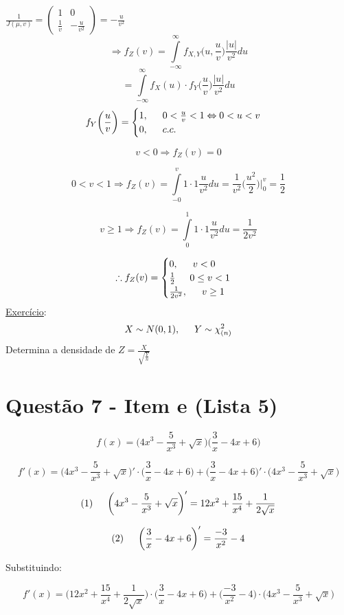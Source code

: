 \documentclass[a4paper,12pt]{article}
\begin{document}
	$
	\frac{1}{J(\mu,v)}=\begin{pmatrix}
	1 & 0\\
	\frac{1}{v} & -\frac{u}{v^2}
	\end{pmatrix} = -\frac{u}{v^2}
	$
	\\
	$$\Rightarrow f_Z(v)= \int\limits_{-\infty}^{\infty}f_{X,Y}\bigg(u,\frac{u}{v}\bigg)  \frac{|u|}{v^2}du$$
	$$=\int\limits_{-\infty}^{\infty}f_X(u)\cdot f_Y\bigg(\frac{u}{v}\bigg)   \frac{|u|}{v^2}du$$
	$$f_Y\bigg(\frac{u}{v}\bigg) = \begin{cases}
	1, \indent 0<\frac{u}{v}<1 \Leftrightarrow 0<u<v\\
	0, \indent c.c.
	\end{cases} $$
	
	$$v<0 \Rightarrow f_Z(v)=0 $$
	
	$$0<v<1\Rightarrow f_Z(v) = \int\limits_{-0}^{v} 1\cdot 1 \frac{u}{v^2} du = \frac{1}{v^2}\bigg(\frac{u^2}{2}\bigg)\bigg|_0^v=\frac{1}{2}$$
	
	$$v\ge 1 \Rightarrow f_Z(v) = \int\limits_{0}^{1} 1\cdot 1 \frac{u}{v^2}du = \frac{1}{2v^2}$$
	
	$$\therefore f_Z(v)=\begin{cases}
	0,\indent v<0\\
	\frac{1}{2 } \indent 0\le v<1\\
	\frac{1}{2v^2},\indent v\ge 1
	\end{cases} $$
	\newpage
	\underline{Exercício}:
	$$X\sim N(0,1),\indent Y\sim \chi^2_{(n)} $$
	Determina a densidade de $Z=\frac{X}{\sqrt{\frac{Y}{n}}}$ 
	
	\newpage 
	\section*{Questão 7 - Item e (Lista 5) }
	$$f(x)=\bigg(4x^3 -\frac{5}{x^3}+\sqrt x \bigg)
	\bigg(
	\frac{3}{x} - 4x+6
	\bigg)
	$$
	
	$$f'(x) = \bigg(4x^3 -\frac{5}{x^3}+\sqrt x\bigg)'\cdot 	\bigg(
	\frac{3}{x} - 4x+6
	\bigg)	
	+
		\bigg(
	\frac{3}{x} - 4x+6
	\bigg)'\cdot
	\bigg(4x^3 -\frac{5}{x^3}+\sqrt x\bigg) $$

	$$ 
		(1)\indent  \bigg(4x^3 -\frac{5}{x^3}+\sqrt x\bigg)' = 12x^2 +\frac{15}{x^4} + \frac{1}{2\sqrt x}
	$$
	
	$$
	(2)\indent 	\bigg(
	\frac{3}{x} - 4x+6
	\bigg)' = \frac{-3}{x^2}- 4
	$$
	
	
	\begin{center}Substituindo: \end{center}
	$$f'(x) = \bigg(
	12x^2 +\frac{15}{x^4} + \frac{1}{2\sqrt x}
	\bigg)
	\cdot 
	\bigg(
	\frac{3}{x} - 4x+6
	\bigg)	
	+
	\bigg(
	 \frac{-3}{x^2}- 4
	\bigg)
	\cdot 
	\bigg(4x^3 -\frac{5}{x^3}+\sqrt x\bigg)
	 $$
	 
\end{document}
